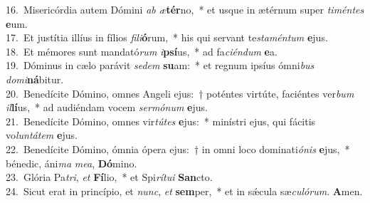 {16.~}Misericórdia autem Dómini \textit{ab} \textit{æ}\textbf{tér}no,~* et usque in ætérnum super \textit{ti}\textit{mén}\textit{tes} \textbf{e}um.\\
{17.~}Et justítia illíus in fílios \textit{fi}\textit{li}\textbf{ó}rum,~* his qui servant te\textit{sta}\textit{mén}\textit{tum} \textbf{e}jus.\\
{18.~}Et mémores sunt mandató\textit{rum} \textit{i}\textbf{psí}us,~* ad fa\textit{ci}\textit{én}\textit{dum} \textbf{e}a.\\
{19.~}Dóminus in cælo parávit \textit{se}\textit{dem} \textbf{su}am:~* et regnum ipsíus ómni\textit{bus} \textit{do}\textit{mi}\textbf{ná}bitur.\\
{20.~}Benedícite Dómino, omnes Angeli ejus:~† poténtes virtúte, faciéntes ver\textit{bum} \textit{il}\textbf{lí}us,~* ad audiéndam vocem \textit{ser}\textit{mó}\textit{num} \textbf{e}jus.\\
{21.~}Benedícite Dómino, omnes vir\textit{tú}\textit{tes} \textbf{e}jus:~* minístri ejus, qui fácitis vo\textit{lun}\textit{tá}\textit{tem} \textbf{e}jus.\\
{22.~}Benedícite Dómino, ómnia ópera ejus:~† in omni loco dominati\textit{ó}\textit{nis} \textbf{e}jus,~* bénedic, áni\textit{ma} \textit{me}\textit{a}, \textbf{Dó}mino.\\
{23.~}Glória Pa\textit{tri}, \textit{et} \textbf{Fí}lio,~* et Spi\textit{rí}\textit{tu}\textit{i} \textbf{San}cto.\\
{24.~}Sicut erat in princípio, et \textit{nunc}, \textit{et} \textbf{sem}per,~* et in sǽcula sæ\textit{cu}\textit{ló}\textit{rum}. \textbf{A}men.\\

